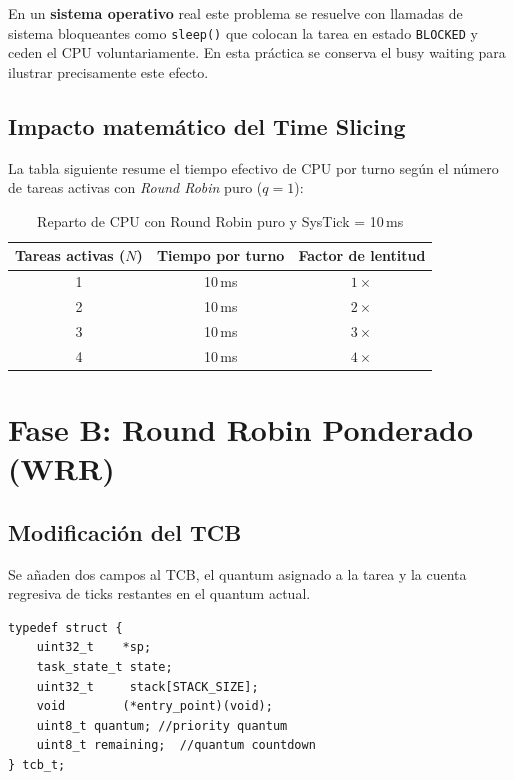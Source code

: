 \documentclass[12pt,letterpaper]{article}
\begin{document}
\noindent
En un \textbf{sistema operativo} real este problema se resuelve con llamadas de sistema bloqueantes como \texttt{sleep()} que colocan la tarea en estado \texttt{BLOCKED} y ceden el CPU voluntariamente. En esta práctica se conserva el busy waiting para ilustrar precisamente este efecto.
 
\subsection*{Impacto matemático del Time Slicing}
La tabla siguiente resume el tiempo efectivo de CPU por turno según el número de tareas activas con \textit{Round Robin} puro ($q = 1$)\footnotemark:
 
\begin{table}[H]
  \centering
  \caption{Reparto de CPU con Round Robin puro y SysTick = 10\,ms}
  \begin{tabular}{ccc}
    \textbf{Tareas activas ($N$)} & \textbf{Tiempo por turno} & \textbf{Factor de lentitud} \\
    \hline
    1 & 10\,ms & $1\times$ \\
    2 & 10\,ms & $2\times$ \\
    3 & 10\,ms & $3\times$ \\
    4 & 10\,ms & $4\times$ \\
  \end{tabular}
\end{table}
 
 
\newpage

\section*{Fase B: Round Robin Ponderado (WRR)}

\subsection*{Modificación del TCB}
Se añaden dos campos al TCB, el quantum asignado a la tarea y la cuenta regresiva de ticks restantes en el quantum actual.
 
\begin{lstlisting}[style=modernc, caption={Nuevos campos en \texttt{tcb\_t} --- \texttt{scheduler.h}}]
typedef struct {
    uint32_t    *sp;
    task_state_t state;
    uint32_t     stack[STACK_SIZE];
    void        (*entry_point)(void);
    uint8_t quantum; //priority quantum
    uint8_t remaining;  //quantum countdown
} tcb_t;
\end{lstlisting}
 
\end{document}

